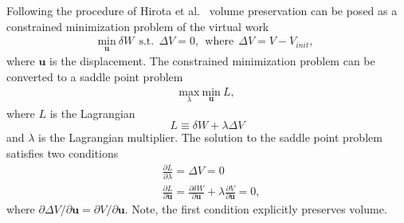 \documentclass[12pt,aps,pre]{revtex4}
\begin{document}
Following the procedure of Hirota et al.\ \cite{Hirota:2000jw} volume preservation can be posed as a constrained minimization problem of the virtual work
%
\begin{equation}
\begin{aligned}
\underset{ \pmb{u}}{\text{min}} \ \delta W \ \ \text{s.t.} \ \ \Delta V = 0, \ \ \text{where} \ \ \Delta V = V - V_{init},\
\end{aligned}
\end{equation}
%
where $\pmb{u}$ is the displacement. The constrained minimization problem can be converted to a saddle point problem
%
\begin{equation}
\begin{aligned}
\underset{\lambda}{\text{max}} \ \underset{\pmb{u}}{\text{min}} \ L,
\end{aligned}
\label{eq:saddlept}
\end{equation}
%
where $L$ is the Lagrangian
%
\begin{equation}
L \equiv \delta W + \lambda \Delta V
\label{eq:Lagrangian}
\end{equation}
%
and $\lambda$ is the Lagrangian multiplier. The solution to the saddle point problem satisfies two conditions
%
\begin{equation}
\begin{aligned}
&\frac{\partial L}{\partial \lambda} = \Delta V = 0 \\
&\frac{\partial L}{\partial \pmb{u}} = \frac{\partial \delta W}{\partial \pmb{u}} + \lambda \frac{\partial V}{\partial \pmb{u}} = 0,
\end{aligned}
\label{eq:conditions}
\end{equation}
%
where $\partial \Delta V/\partial \pmb{u} = \partial V/\partial \pmb{u}$. Note, the first condition explicitly preserves volume. 
\end{document}
